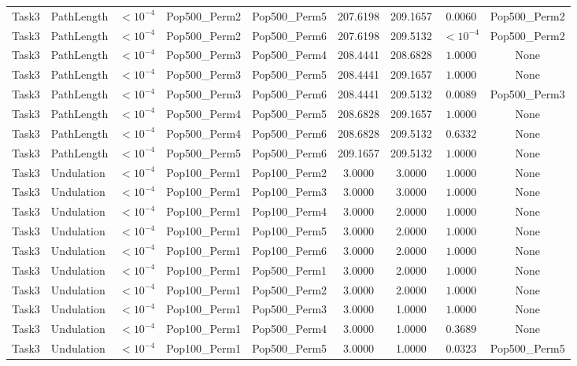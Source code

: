 \documentclass[8pt]{article}
\begin{document}
\begin{longtable}{llccccccc}
Task3 & PathLength & $< 10^{-4}$ & Pop500\_Perm2 & Pop500\_Perm5 & 207.6198 & 209.1657 & $0.0060$ & Pop500\_Perm2 \\
Task3 & PathLength & $< 10^{-4}$ & Pop500\_Perm2 & Pop500\_Perm6 & 207.6198 & 209.5132 & $< 10^{-4}$ & Pop500\_Perm2 \\
Task3 & PathLength & $< 10^{-4}$ & Pop500\_Perm3 & Pop500\_Perm4 & 208.4441 & 208.6828 & $1.0000$ & None \\
Task3 & PathLength & $< 10^{-4}$ & Pop500\_Perm3 & Pop500\_Perm5 & 208.4441 & 209.1657 & $1.0000$ & None \\
Task3 & PathLength & $< 10^{-4}$ & Pop500\_Perm3 & Pop500\_Perm6 & 208.4441 & 209.5132 & $0.0089$ & Pop500\_Perm3 \\
Task3 & PathLength & $< 10^{-4}$ & Pop500\_Perm4 & Pop500\_Perm5 & 208.6828 & 209.1657 & $1.0000$ & None \\
Task3 & PathLength & $< 10^{-4}$ & Pop500\_Perm4 & Pop500\_Perm6 & 208.6828 & 209.5132 & $0.6332$ & None \\
Task3 & PathLength & $< 10^{-4}$ & Pop500\_Perm5 & Pop500\_Perm6 & 209.1657 & 209.5132 & $1.0000$ & None \\
Task3 & Undulation & $< 10^{-4}$ & Pop100\_Perm1 & Pop100\_Perm2 & 3.0000 & 3.0000 & $1.0000$ & None \\
Task3 & Undulation & $< 10^{-4}$ & Pop100\_Perm1 & Pop100\_Perm3 & 3.0000 & 3.0000 & $1.0000$ & None \\
Task3 & Undulation & $< 10^{-4}$ & Pop100\_Perm1 & Pop100\_Perm4 & 3.0000 & 2.0000 & $1.0000$ & None \\
Task3 & Undulation & $< 10^{-4}$ & Pop100\_Perm1 & Pop100\_Perm5 & 3.0000 & 2.0000 & $1.0000$ & None \\
Task3 & Undulation & $< 10^{-4}$ & Pop100\_Perm1 & Pop100\_Perm6 & 3.0000 & 2.0000 & $1.0000$ & None \\
Task3 & Undulation & $< 10^{-4}$ & Pop100\_Perm1 & Pop500\_Perm1 & 3.0000 & 2.0000 & $1.0000$ & None \\
Task3 & Undulation & $< 10^{-4}$ & Pop100\_Perm1 & Pop500\_Perm2 & 3.0000 & 2.0000 & $1.0000$ & None \\
Task3 & Undulation & $< 10^{-4}$ & Pop100\_Perm1 & Pop500\_Perm3 & 3.0000 & 1.0000 & $1.0000$ & None \\
Task3 & Undulation & $< 10^{-4}$ & Pop100\_Perm1 & Pop500\_Perm4 & 3.0000 & 1.0000 & $0.3689$ & None \\
Task3 & Undulation & $< 10^{-4}$ & Pop100\_Perm1 & Pop500\_Perm5 & 3.0000 & 1.0000 & $0.0323$ & Pop500\_Perm5 \\

\end{longtable}
\end{document}
